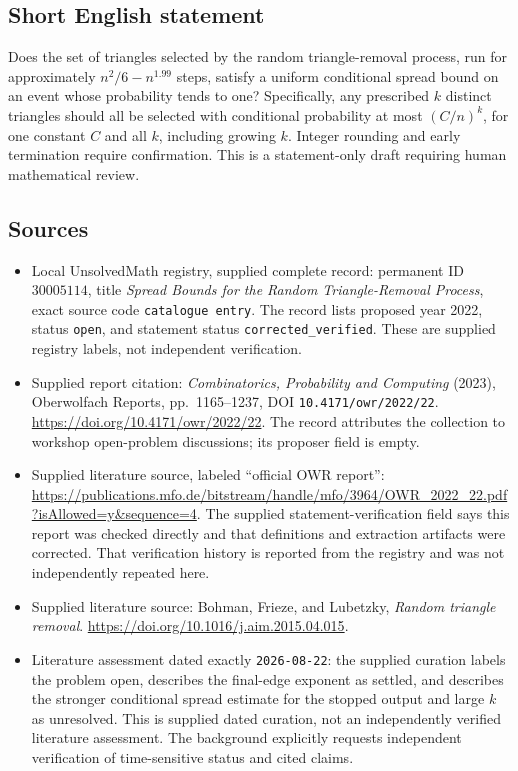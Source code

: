 \documentclass[11pt]{article}
\begin{document}
\subsection{Short English statement}
Does the set of triangles selected by the random triangle-removal process, run for approximately \(n^2/6-n^{1.99}\) steps, satisfy a uniform conditional spread bound on an event whose probability tends to one? Specifically, any prescribed \(k\) distinct triangles should all be selected with conditional probability at most \((C/n)^k\), for one constant \(C\) and all \(k\), including growing \(k\). Integer rounding and early termination require confirmation. This is a statement-only draft requiring human mathematical review.
\subsection{Sources}
\begin{itemize}
\item Local UnsolvedMath registry, supplied complete record: permanent ID \(30005114\), title \emph{Spread Bounds for the Random Triangle-Removal Process}, exact source code \texttt{catalogue entry}. The record lists proposed year 2022, status \texttt{open}, and statement status \texttt{corrected\_verified}. These are supplied registry labels, not independent verification.
\item Supplied report citation: \emph{Combinatorics, Probability and Computing} (2023), Oberwolfach Reports, pp.\ 1165--1237, DOI \texttt{10.4171/owr/2022/22}. \url{https://doi.org/10.4171/owr/2022/22}. The record attributes the collection to workshop open-problem discussions; its proposer field is empty.
\item Supplied literature source, labeled ``official OWR report'': \url{https://publications.mfo.de/bitstream/handle/mfo/3964/OWR_2022_22.pdf?isAllowed=y&sequence=4}. The supplied statement-verification field says this report was checked directly and that definitions and extraction artifacts were corrected. That verification history is reported from the registry and was not independently repeated here.
\item Supplied literature source: Bohman, Frieze, and Lubetzky, \emph{Random triangle removal}. \url{https://doi.org/10.1016/j.aim.2015.04.015}.
\item Literature assessment dated exactly \texttt{2026-08-22}: the supplied curation labels the problem open, describes the final-edge exponent as settled, and describes the stronger conditional spread estimate for the stopped output and large \(k\) as unresolved. This is supplied dated curation, not an independently verified literature assessment. The background explicitly requests independent verification of time-sensitive status and cited claims.
\end{itemize}
\end{document}
